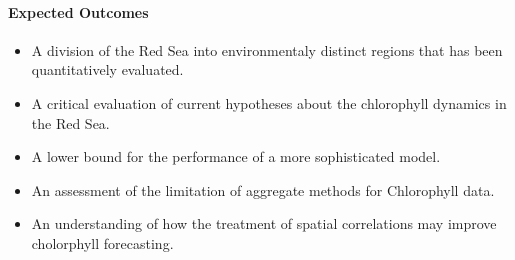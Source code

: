 \paragraph{Expected Outcomes}

\begin{itemize}

\item A division of the Red Sea into environmentaly distinct regions that has
been quantitatively evaluated.

\item A critical evaluation of current hypotheses about the chlorophyll
dynamics in the Red Sea.

\item A lower bound for the performance of a more sophisticated model.

\item An assessment of the limitation of aggregate methods for Chlorophyll
data.

\item An understanding of how the treatment of spatial correlations may improve
cholorphyll forecasting.

\end{itemize}
